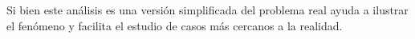 \documentclass[../tesis_main_file.tex]{subfiles}
\begin{document}
Si bien este análisis es una versión simplificada del problema real ayuda a ilustrar el fenómeno y facilita el estudio de casos más cercanos a la realidad.\\
%
\end{document}
